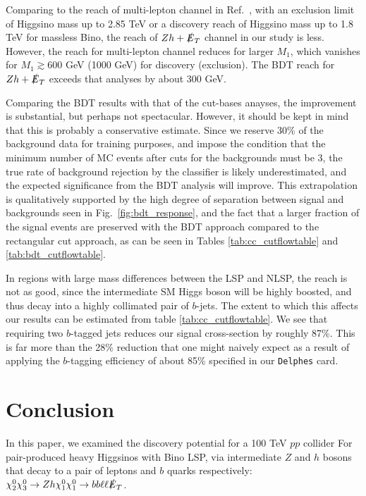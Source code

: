 \documentclass[a4paper,11pt]{article}
\newcommand{\met}{{\slashed{E}_T}}
\begin{document}
Comparing to the reach of multi-lepton channel in Ref.~\citep{Gori:2014oua}, with an  exclusion limit of Higgsino mass up to 2.85 TeV or a discovery reach of Higgsino mass up to 1.8 TeV for massless Bino, the reach of $Zh+\met$ channel in our study is less.  However, the reach for multi-lepton channel reduces for larger $M_1$, which vanishes for $M_1\gtrsim 600$ GeV (1000 GeV) for discovery (exclusion).   The BDT reach for $Zh+\met$ exceeds that analyses by about 300 GeV.  


Comparing the BDT results with that of the cut-bases anayses, the improvement is substantial, but perhaps not spectacular. However, it should
be kept in mind that this is probably a conservative estimate. Since we reserve
30\% of the background data for training purposes, and impose the condition that the
minimum number of MC events after cuts for the backgrounds must be 3, the true rate of background
rejection by the classifier is likely underestimated, and the expected
significance from the BDT analysis will improve. This extrapolation is
qualitatively supported by the high degree of separation between signal and
backgrounds seen in Fig.~\ref{fig:bdt_response}, and the fact that a larger
fraction of the signal events are preserved with the BDT approach compared to
the rectangular cut approach, as can be seen in Tables \ref{tab:cc_cutflowtable}
and \ref{tab:bdt_cutflowtable}.  

In regions with large mass differences between the LSP and NLSP, the reach is
not as good, since the intermediate SM Higgs boson will be highly boosted, and
thus decay into a highly collimated pair of $b$-jets. The extent to which this
affects our results can be estimated from table \ref{tab:cc_cutflowtable}. We
see that requiring two $b$-tagged jets reduces our signal cross-section by
roughly 87\%. This is far more than the 28\% reduction that one might naively
expect as a result of applying the $b$-tagging efficiency of about 85\%
specified in our \texttt{Delphes} card.  
 

\section{Conclusion}\label{sec:conclusion}

In this paper, we examined the discovery potential for a 100 TeV $pp$ collider For 
pair-produced heavy Higgsinos with Bino LSP, via 
intermediate $Z$ and $h$ bosons that decay to a pair of leptons and $b$ quarks respectively:  $\chi_2^0\chi_3^0\rightarrow Zh \chi_1^0\chi_1^0\rightarrow bb\ell\ell \met$.
\end{document}
